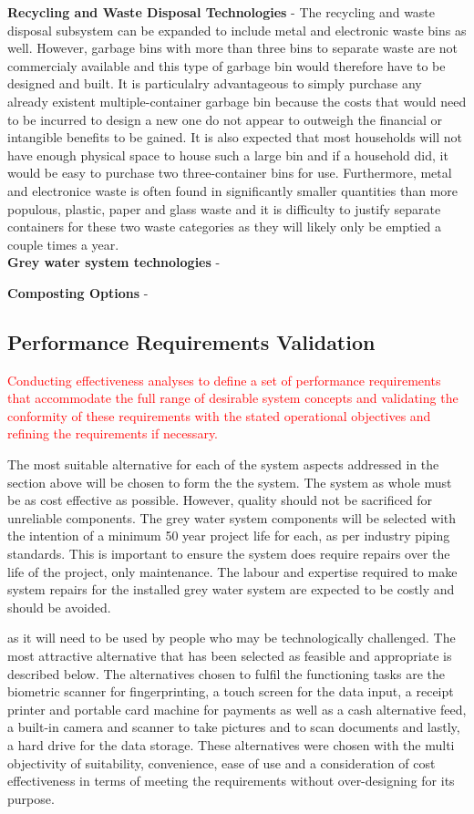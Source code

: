 \documentclass[a4paper,11pt,fleqn]{report}
\begin{document}
\textbf{Recycling and Waste Disposal Technologies} - The recycling and waste disposal subsystem can be expanded to include metal and electronic waste bins as well. However, garbage bins with more than three bins to separate waste are not commercialy available and this type of garbage bin would therefore have to be designed and built. It is particulalry advantageous to simply purchase any already existent multiple-container garbage bin because the costs that would need to be incurred to design a new one do not appear to outweigh the financial or intangible benefits to be gained. It is also expected that most households will not have enough physical space to house such a large bin and if a household did, it would be easy to purchase two three-container bins for use. Furthermore, metal and electronice waste is often found in significantly smaller quantities than more populous, plastic, paper and glass waste and it is difficulty to justify separate containers for these two waste categories as they will likely only be emptied a couple times a year.\\

\textbf{Grey water system technologies} - 
	
	
\textbf{Composting Options} - 
	

\subsection{Performance Requirements Validation}
\textcolor{red}{Conducting effectiveness analyses to define a set of performance requirements that accommodate the full range of desirable system concepts and validating the conformity of these requirements with the stated operational objectives and refining the requirements if necessary.}

The most suitable alternative for each of the system aspects addressed in the section above will be chosen to form the the system. The system as whole must be as cost effective as possible. However, quality should not be sacrificed for unreliable components. The grey water system components will be selected with the intention of a minimum 50 year project life for each, as per industry piping standards. %
This is important to ensure the system does require repairs over the life of the project, only maintenance. The labour and expertise required to make system repairs for the installed grey water system are expected to be costly and should be avoided.

as it will need to be used by people who may be technologically challenged. The most attractive alternative that has been selected as feasible and appropriate is described below.
The alternatives chosen to fulfil the functioning tasks are the biometric scanner for fingerprinting, a touch screen for the data input, a receipt printer and portable card machine for payments as well as a cash alternative feed, a built-in camera and scanner to take pictures and to scan documents and lastly, a hard drive for the data storage. These alternatives were chosen with the multi objectivity of suitability, convenience, ease of use and a consideration of cost effectiveness in terms of meeting the requirements without over-designing for its purpose.
\end{document}
